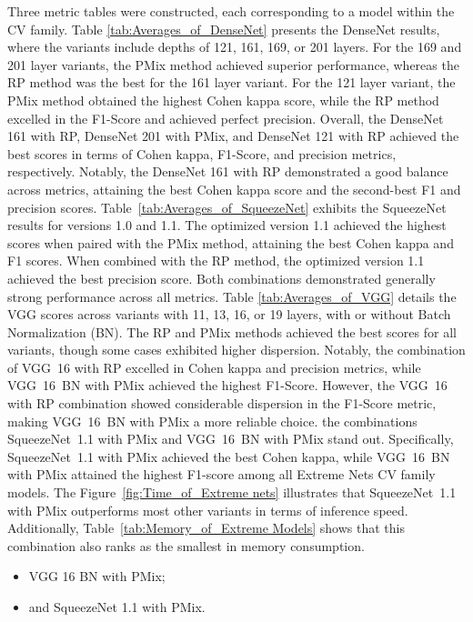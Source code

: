 Three metric tables were constructed, each corresponding to a model within the \gls{CV} family.
Table \ref{tab:Averages_of_DenseNet} presents the DenseNet results, where the variants include depths of 121, 161, 169, or 201 layers. For the 169 and 201 layer variants, the \gls{PMix} method achieved superior performance, whereas the \gls{RP} method was the best for the 161 layer variant. For the 121 layer variant, the \gls{PMix} method obtained the highest Cohen kappa score, while the \gls{RP} method excelled in the F1-Score and achieved perfect precision. Overall, the DenseNet 161 with \gls{RP}, DenseNet 201 with \gls{PMix}, and DenseNet 121 with \gls{RP} achieved the best scores in terms of Cohen kappa, F1-Score, and precision metrics, respectively. Notably, the DenseNet 161 with \gls{RP} demonstrated a good balance across metrics, attaining the best Cohen kappa score and the second-best F1 and precision scores.
Table~\ref{tab:Averages_of_SqueezeNet} exhibits the SqueezeNet results for versions 1.0 and 1.1. The optimized version 1.1 achieved the highest scores when paired with the \gls{PMix} method, attaining the best Cohen kappa and F1 scores. When combined with the \gls{RP} method, the optimized version 1.1 achieved the best precision score. Both combinations demonstrated generally strong performance across all metrics.
Table \ref{tab:Averages_of_VGG} details the VGG scores across variants with 11, 13, 16, or 19 layers, with or without Batch Normalization (BN). The \gls{RP} and \gls{PMix} methods achieved the best scores for all variants, though some cases exhibited higher dispersion. Notably, the combination of \mbox{VGG 16} with \gls{RP} excelled in Cohen kappa and precision metrics, while \mbox{VGG 16 BN} with \gls{PMix} achieved the highest F1-Score. However, the \mbox{VGG 16} with \gls{RP} combination showed considerable dispersion in the F1-Score metric, making \mbox{VGG 16 BN} with \gls{PMix} a more reliable choice.
the combinations \mbox{SqueezeNet 1.1} with \gls{PMix} and \mbox{VGG 16 BN} with \gls{PMix} stand out. Specifically, \mbox{SqueezeNet 1.1} with \gls{PMix} achieved the best Cohen kappa, while \mbox{VGG 16 BN} with \gls{PMix} attained the highest F1-score among all Extreme Nets \gls{CV} family models. The Figure~\ref{fig:Time_of_Extreme nets} illustrates that \mbox{SqueezeNet 1.1} with \gls{PMix} outperforms most other variants in terms of inference speed. Additionally, Table~\ref{tab:Memory_of_Extreme Models} shows that this combination also ranks as the smallest in memory consumption.  
\begin{itemize}
	\item VGG 16 BN with \gls{PMix};
	\item and SqueezeNet 1.1 with \gls{PMix}.
\end{itemize}


